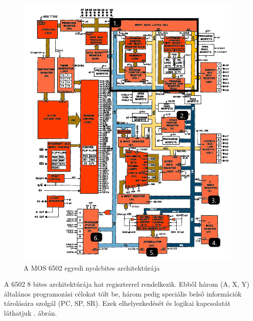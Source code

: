 	\begin{figure}[H]
	\centering
	\includegraphics[width=150mm, keepaspectratio]{figures/6502-blokk-diagram-pined}
	\caption{A MOS 6502 egyedi nyolcbites architektúrája \cite{6502_CPU}}
	\label{fig:6502-Blokk-diagram}
	\end{figure}

	A 6502 8 bites architektúrája hat regiszterrel rendelkezik. Ebből három (A, X, Y) általános programozási célokat tölt be, három pedig speciális belső információk tárolására szolgál (PC, SP, SR). Ezek elhelyezkedését és logikai kapcsolatát láthatjuk . ábrán.
	
